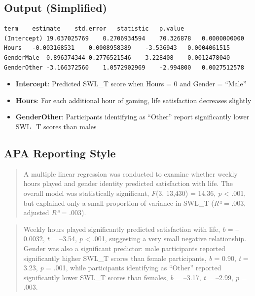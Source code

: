 \documentclass[
]{book}
\providecommand{\tightlist}{%
  \setlength{\itemsep}{0pt}\setlength{\parskip}{0pt}}
\begin{document}
\subsection{Output (Simplified)}\label{output-simplified}

\begin{verbatim}
term    estimate    std.error   statistic   p.value
(Intercept) 19.037025769    0.2706934594    70.326878   0.0000000000
Hours   -0.003168531    0.0008958389    -3.536943   0.0004061515
GenderMale  0.896374344 0.2776521546    3.228408    0.0012478040
GenderOther -3.166372560    1.0572902969    -2.994800   0.0027512578
\end{verbatim}

\begin{itemize}
\tightlist
\item
  \textbf{Intercept}: Predicted SWL\_T score when Hours = 0 and Gender = ``Male''
\item
  \textbf{Hours}: For each additional hour of gaming, life satisfaction decreases slightly
\item
  \textbf{GenderOther}: Participants identifying as ``Other'' report significantly lower SWL\_T scores than males
\end{itemize}

\subsection{APA Reporting Style}\label{apa-reporting-style-3}

\begin{quote}
A multiple linear regression was conducted to examine whether weekly hours played and gender identity predicted satisfaction with life. The overall model was statistically significant, \emph{F}(3, 13,430) = 14.36, \emph{p} \textless{} .001, but explained only a small proportion of variance in SWL\_T (\emph{R²} = .003, adjusted \emph{R²} = .003).
\end{quote}

\begin{quote}
Weekly hours played significantly predicted satisfaction with life, \emph{b} = --0.0032, \emph{t} = --3.54, \emph{p} \textless{} .001, suggesting a very small negative relationship. Gender was also a significant predictor: male participants reported significantly higher SWL\_T scores than female participants, \emph{b} = 0.90, \emph{t} = 3.23, \emph{p} = .001, while participants identifying as ``Other'' reported significantly lower SWL\_T scores than females, \emph{b} = --3.17, \emph{t} = --2.99, \emph{p} = .003.
\end{quote}
\end{document}
